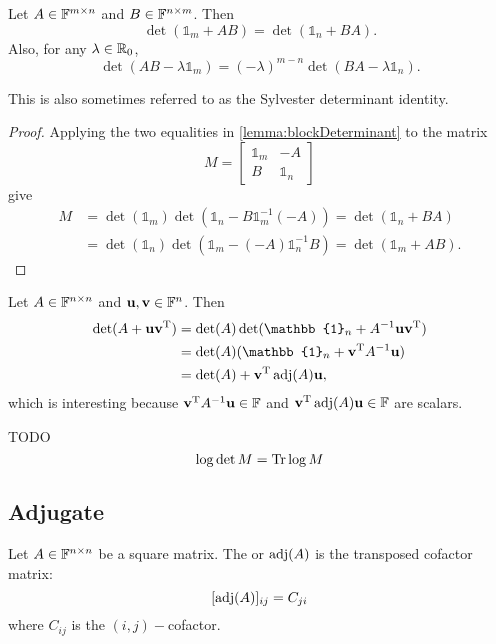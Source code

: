 \begin{lemma}
Let $A\in\mathbb{F}^{m\times n}$ and $B\in\mathbb{F}^{n\times m}$. Then
\[ \det(\mathbb{1}_{m} + AB) = \det(\mathbb{1}_{n} + BA). \]
Also, for any $\lambda\in\mathbb{R}_0$,
\[ \det(AB - \lambda\mathbb{1}_{m}) = (-\lambda)^{m-n}\det(BA - \lambda\mathbb{1}_{n}). \]
\end{lemma}
This is also sometimes referred to as the Sylvester determinant identity.
\begin{proof}
Applying the two equalities in \ref{lemma:blockDeterminant} to the matrix
\[ M = \begin{bmatrix}
\mathbb{1}_m & -A \\
B & \mathbb{1}_n
\end{bmatrix} \]
give
\begin{align*}
M &= \det(\mathbb{1}_m)\det(\mathbb{1}_n - B\mathbb{1}_m^{-1}(-A)) = \det(\mathbb{1}_n+BA) \\
&= \det(\mathbb{1}_n)\det(\mathbb{1}_m - (-A)\mathbb{1}_n^{-1}B) = \det(\mathbb{1}_m+AB).
\end{align*}
\end{proof}
\begin{corollary}
Let $A\in\mathbb{F}^{n\times n}$ and $\bm{\mathrm{u}},\bm{\mathrm{v}}\in\mathbb{F}^n$. Then
\begin{align*}
\det(A+\vec{u}\vec{v}^\transp) &= \det(A)\det(\mathbb{1}_n + A^{-1}\vec{u}\vec{v}^\transp) \\
&= \det(A)(\mathbb{1}_n + \vec{v}^\transp A^{-1}\vec{u}) \\
&= \det(A) + \vec{v}^\transp \adj(A)\vec{u},
\end{align*}
which is interesting because $\bm{\mathrm{v}}^{\mathrm{T}} A^{-1}\bm{\mathrm{u}} \in\mathbb{F}$  and $\bm{\mathrm{v}}^{\mathrm{T}} \operatorname{adj}(A)\bm{\mathrm{u}}\in\mathbb{F}$ are scalars.
\end{corollary}

TODO
\[ \log\det M=\operatorname{Tr}\log M \]


\subsection{Adjugate}
\begin{definition}
Let $A\in\mathbb{F}^{n\times n}$ be a square matrix. The  or  $\operatorname{adj}(A)$ is the transposed cofactor matrix:
\[ [\operatorname{adj}(A)]_{ij} = C_{ji} \]
where $C_{ij}$ is the $(i,j)-$cofactor.
\end{definition}

